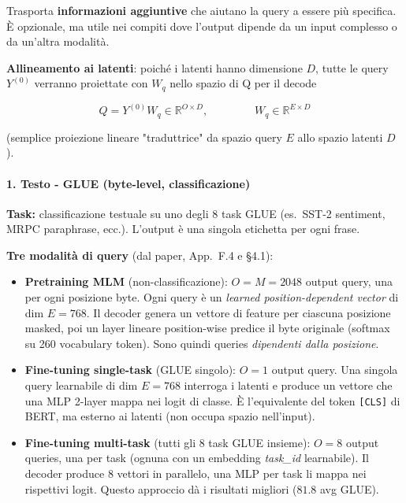 \documentclass[
  11pt,
]{article}
\begin{document}
Trasporta \textbf{informazioni aggiuntive} che aiutano la query a essere
più specifica.\\
È opzionale, ma utile nei compiti dove l'output dipende da un input
complesso o da un'altra modalità.


\textbf{Allineamento ai latenti}: poiché i latenti hanno dimensione
\(D\), tutte le query \(Y^{(0)}\) verranno proiettate con \(W_{q}\)
nello spazio di Q per il decode

\[Q = Y^{(0)}W_{q} \in \mathbb{R}^{O \times D},\ {\ \ \ \ \ \ \ \ \ \ \ \ \ \ \ \ \ \ W}_{q} \in \mathbb{R}^{E \times D}\]

(semplice proiezione lineare "traduttrice" da spazio query \(E\) allo
spazio latenti \(D\) ).

\paragraph{1. \textbf{Testo - GLUE (byte-level, classificazione)}}

\textbf{Task:} classificazione testuale su uno degli 8 task GLUE (es.\ SST-2 sentiment, MRPC paraphrase, ecc.). L'output è una singola etichetta per ogni frase.

\textbf{Tre modalità di query} (dal paper, App.\ F.4 e \S4.1):

\begin{itemize}\setlength\itemsep{0.4em}
\item \textbf{Pretraining MLM} (non-classificazione): $O = M = 2048$ output query, una per ogni posizione byte. Ogni query è un \emph{learned position-dependent vector} di dim $E = 768$. Il decoder genera un vettore di feature per ciascuna posizione masked, poi un layer lineare position-wise predice il byte originale (softmax su 260 vocabulary token). Sono quindi queries \emph{dipendenti dalla posizione}.

\item \textbf{Fine-tuning single-task} (GLUE singolo): $O = 1$ output query. Una singola query learnabile di dim $E = 768$ interroga i latenti e produce un vettore che una MLP 2-layer mappa nei logit di classe. È l'equivalente del token \texttt{[CLS]} di BERT, ma esterno ai latenti (non occupa spazio nell'input).

\item \textbf{Fine-tuning multi-task} (tutti gli 8 task GLUE insieme): $O = 8$ output queries, una per task (ognuna con un embedding \emph{task\_id} learnabile). Il decoder produce 8 vettori in parallelo, una MLP per task li mappa nei rispettivi logit. Questo approccio dà i risultati migliori ($81.8$ avg GLUE).
\end{itemize}
\end{document}
